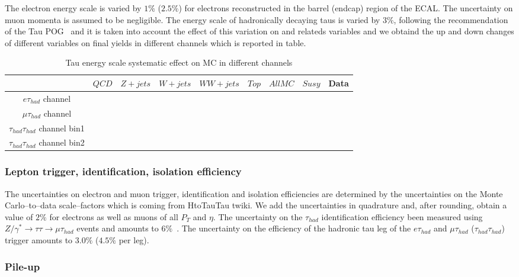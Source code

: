 The electron energy scale is varied by $1\%$ ($2.5\%$) for electrons reconstructed in the barrel (endcap) region of the ECAL.
The uncertainty on muon momenta is assumed to be negligible. The energy scale of hadronically decaying taus is varied by $3\%$, following the recommendation of the Tau POG~\cite{TauPOG} and it is taken into account the effect of this variation on \met and \pT relateds variables and we obtaind the up and down changes of different variables on final yields in different channels which is reported in table.

\begin{table}[!h]
\begin{center}
\begin{tabular}{|c|c|c|c|c|c|c|c|c|}
\hline
                                    &$QCD$&$Z+jets$&$W+jets$&$WW+jets$&$Top$& $All MC$ & $Susy$ & Data \\\hline 
$e\tau_{had}$ channel               &     &        &        &         &     &          &        &      \\\hline   
$\mu\tau_{had}$ channel             &     &        &        &         &     &          &        &      \\\hline  
$\tau_{had}\tau_{had}$ channel bin1 &     &        &        &         &     &          &        &      \\\hline
$\tau_{had}\tau_{had}$ channel bin2 &     &        &        &         &     &          &        &      \\\hline
\end{tabular} 
\end{center}
\caption{Tau energy scale systematic effect on MC in different channels
}
\label{Tab.susyHiggs}
\end{table}     


\subsubsection{Lepton trigger, identification, isolation efficiency}

  The uncertainties on electron and muon trigger, identification and isolation efficiencies
  are determined by the uncertainties on the Monte Carlo--to--data scale--factors 
  which is coming from HtoTauTau twiki.
  We add the uncertainties in quadrature and, after rounding, obtain a value of $2\%$ for electrons as well as muons of all $P_{T}$ and $\eta$.
  The uncertainty on the $\tau_{had}$ identification efficiency 
  been measured using $Z/\gamma^{*} \to \tau\tau \to \mu\tau_{had}$ events
  and amounts to $6\%$~\cite{TauPOG}.
  The uncertainty on the efficiency of the hadronic tau leg of the $e\tau_{had}$ and $\mu\tau_{had}$ ($\tau_{had}\tau_{had}$) trigger
  amounts to $3.0\%$ ($4.5\%$ per leg).

\subsubsection{Pile-up}



